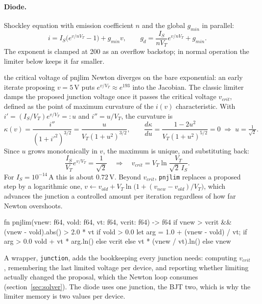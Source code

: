 \documentclass[11pt]{article}
\begin{document}
\paragraph{Diode.}
Shockley equation with emission coefficient $n$ and the global
$g_{min}$ in parallel:
\[
i = I_S \bigl( e^{v/nV_T} - 1 \bigr) + g_{min} v, \qquad
g_d = \frac{I_S}{nV_T} e^{v/nV_T} + g_{min}.
\]
The exponent is clamped at 200 as an overflow backstop; in normal
operation the limiter below keeps it far smaller.

\begin{derivation}{the critical voltage of pnjlim}
Newton diverges on the bare exponential: an early iterate proposing
$v = 5$\,V puts $e^{v/V_T} \approx e^{193}$ into the Jacobian. The classic
limiter damps the proposed junction voltage once it passes the critical
voltage $v_{crit}$, defined as the point of maximum curvature of the
$i(v)$ characteristic. With $i' = (I_S/V_T)e^{v/V_T} =: u$ and
$i'' = u/V_T$, the curvature is
\[
\kappa(v) = \frac{i''}{(1 + i'^2)^{3/2}}
          = \frac{u}{V_T (1 + u^2)^{3/2}}, \qquad
\frac{d\kappa}{du} = \frac{1 - 2u^2}{V_T (1 + u^2)^{5/2}} = 0
\;\Longrightarrow\; u = \tfrac{1}{\sqrt{2}}.
\]
Since $u$ grows monotonically in $v$, the maximum is unique, and
substituting back:
\[
\frac{I_S}{V_T} e^{v/V_T} = \frac{1}{\sqrt{2}}
\quad\Longrightarrow\quad
v_{crit} = V_T \ln \frac{V_T}{\sqrt{2}\, I_S}.
\]
For $I_S = 10^{-14}$\,A this is about $0.72$\,V. Beyond $v_{crit}$, \texttt{pnjlim}
replaces a proposed step by a logarithmic one,
$v \leftarrow v_{old} + V_T \ln\bigl(1 + (v_{new} - v_{old})/V_T\bigr)$,
which advances the junction a controlled amount per iteration regardless
of how far Newton overshoots.
\end{derivation}

\begin{rust}
fn pnjlim(vnew: f64, vold: f64, vt: f64, vcrit: f64) -> f64 {
    if vnew > vcrit && (vnew - vold).abs() > 2.0 * vt {
        if vold > 0.0 {
            let arg = 1.0 + (vnew - vold) / vt;
            if arg > 0.0 { vold + vt * arg.ln() } else { vcrit }
        } else {
            vt * (vnew / vt).ln()
        }
    } else {
        vnew
    }
}
\end{rust}

A wrapper, \texttt{junction}, adds the bookkeeping every junction needs:
computing $v_{crit}$, remembering the last limited voltage per device,
and reporting whether limiting actually changed the proposal, which the
Newton loop consumes (section~\ref{sec:solver}). The diode uses one
junction, the BJT two, which is why the limiter memory is two values per
device.
\end{document}
